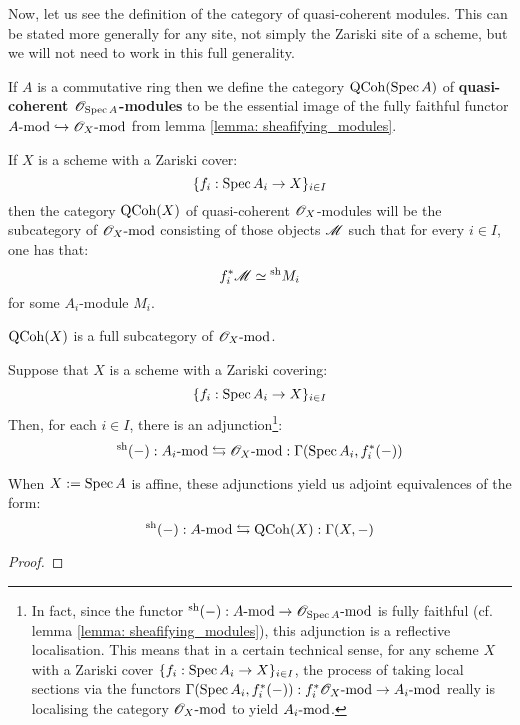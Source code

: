             Now, let us see the definition of the category of quasi-coherent modules. This can be stated more generally for any site, not simply the Zariski site of a scheme, but we will not need to work in this full generality.
            \begin{definition} \label{def: quasi_coherent_modules}
                If $A$ is a commutative ring then we define the category $\QCoh(\Spec A)$ of \textbf{quasi-coherent $\scrO_{\Spec A}$-modules} to be the essential image of the fully faithful functor $A\mod \hookrightarrow \scrO_X\mod$ from lemma \ref{lemma: sheafifying_modules}.

                If $X$ is a scheme with a Zariski cover:
                    $$\{ f_i: \Spec A_i \to X \}_{i \in I}$$
                then the category $\QCoh(X)$ of quasi-coherent $\scrO_X$-modules will be the subcategory of $\scrO_X\mod$ consisting of those objects $\scrM$ such that for every $i \in I$, one has that:
                    $$f_i^*\scrM \cong {}^{\sh}M_i$$
                for some $A_i$-module $M_i$.
            \end{definition}
            \begin{remark}
                $\QCoh(X)$ is a full subcategory of $\scrO_X\mod$.
            \end{remark}
            \begin{theorem} \label{theorem: qcoh_global_section_functor_admits_right_adjoint}
                Suppose that $X$ is a scheme with a Zariski covering:
                    $$\{f_i: \Spec A_i \to X\}_{i \in I}$$
                Then, for each $i \in I$, there is an adjunction\footnote{In fact, since the functor ${}^{\sh}(-): A\mod \to \scrO_{\Spec A}\mod$ is fully faithful (cf. lemma \ref{lemma: sheafifying_modules}), this adjunction is a reflective localisation. This means that in a certain technical sense, for any scheme $X$ with a Zariski cover $\{f_i: \Spec A_i \to X\}_{i \in I}$, the process of taking local sections via the functors $\Gamma(\Spec A_i, f_i^*(-)): f_i^*\scrO_X\mod \to A_i\mod$ really is localising the category $\scrO_X\mod$ to yield $A_i\mod$.}:
                    $${}^{\sh}(-): A_i\mod \leftrightarrows \scrO_X\mod: \Gamma(\Spec A_i, f_i^*(-))$$
                    
                When $X := \Spec A$ is affine, these adjunctions yield us adjoint equivalences of the form:
                    $${}^{\sh}(-): A\mod \leftrightarrows \QCoh(X): \Gamma(X, -)$$
            \end{theorem}
                \begin{proof}
                    
                \end{proof}

